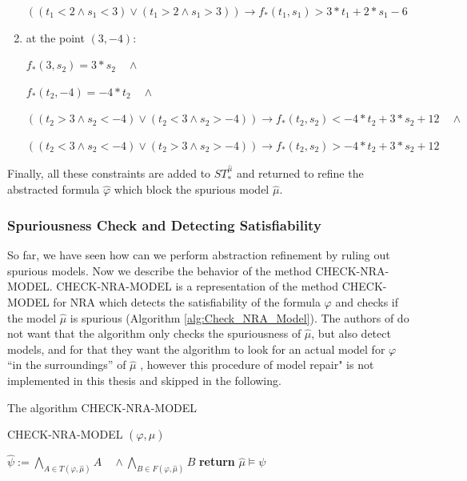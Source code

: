 \begin{example}
\begin{enumerate}
     $((t_{1} < 2 \wedge s_{1} < 3) \vee (t_{1} > 2 \wedge s_{1} > 3)) \to f_{\ast}(t_{1}, s_{1}) > 3 \ast t_{1} + 2 \ast s_{1} - 6$
    \item at the point $(3, -4)$: 
    
    $f_{\ast}(3, s_{2}) = 3 \ast s_{2} \quad \wedge$
    
    $f_{\ast}(t_{2}, -4) = -4 \ast t_{2} \quad \wedge$
    
    $((t_{2} > 3 \wedge s_{2} < -4) \vee (t_{2} < 3 \wedge s_{2} > -4)) \to f_{\ast}(t_{2}, s_{2}) < -4 \ast t_{2} + 3 \ast s_{2} + 12 \quad \wedge$
    
     $((t_{2} < 3 \wedge s_{2} < -4) \vee (t_{2} > 3 \wedge s_{2} > -4)) \to f_{\ast}(t_{2}, s_{2}) > -4 \ast t_{2} + 3 \ast s_{2} + 12$
    \end{enumerate}
    
    \noindent Finally, all these constraints are added to $ST_{\ast}^{\hat{\mu}}$ and returned to refine the abstracted formula $\hat{\varphi}$ which block the spurious model $\hat{\mu}$.
\end{example}

\subsubsection{Spuriousness Check and Detecting Satisfiability}
\label{subsubsec:Spuriousness_Check_ and_Detecting_Satisfiability}
So far, we have seen how can we perform abstraction refinement by ruling out spurious models.
Now we describe the behavior of the method CHECK-NRA-MODEL.
CHECK-NRA-MODEL is a representation of the method CHECK-MODEL for NRA which detects the satisfiability of the formula $\varphi$ and checks if the model $\hat{\mu}$ is spurious (Algorithm \ref{alg:Check_NRA_Model}).
The authors of \cite{Cimatti:2018:ILS:3274693.3230639} do not want that the algorithm only checks the spuriousness of $\hat{\mu}$, but also detect models, and for that they want the algorithm to look for an actual model for $\varphi$ \enquote{in the surroundings} of $\hat{\mu}$ \cite{Cimatti:2018:ILS:3274693.3230639}, however this procedure of model repair" is not implemented in this thesis and skipped in the following.\newline

\begin{algorithm}
\caption{The algorithm CHECK-NRA-MODEL \cite{Cimatti:2018:ILS:3274693.3230639}} 
\label{alg:Check_NRA_Model}
CHECK-NRA-MODEL $(\varphi, \hat{\mu})$
\begin{algorithmic}[1]
\State $\hat{\psi} := \bigwedge\limits_{A \in T(\varphi, \hat{\mu})} A \quad \wedge \bigwedge\limits_{B \in F(\varphi, \hat{\mu})} B$
\State \textbf{return} $\hat{\mu} \models \psi$
\end{algorithmic}
\end{algorithm}

